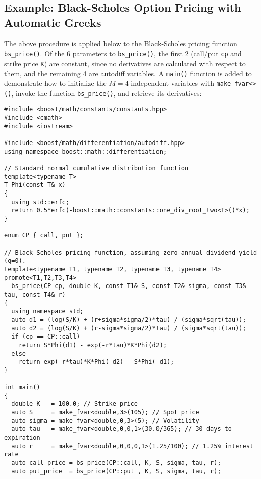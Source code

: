 \documentclass{article}
\begin{document}
\subsection{Example: Black-Scholes Option Pricing with Automatic Greeks}
The above procedure is applied below to the Black-Scholes pricing function {\tt bs\_price()}. Of the 6 parameters
to {\tt bs\_price()}, the first 2 (call/put {\tt cp} and strike price {\tt K}) are constant, since no derivatives
are calculated with respect to them, and the remaining 4 are autodiff variables. A {\tt main()} function is added
to demonstrate how to initialize the $M=4$ independent variables with {\tt make\_fvar<>()}, invoke the function
{\tt bs\_price()}, and retrieve its derivatives:

\begingroup
\fontsize{10pt}{10pt}\selectfont
\begin{verbatim}
#include <boost/math/constants/constants.hpp>
#include <cmath>
#include <iostream>

#include <boost/math/differentiation/autodiff.hpp>
using namespace boost::math::differentiation;

// Standard normal cumulative distribution function
template<typename T>
T Phi(const T& x)
{
  using std::erfc;
  return 0.5*erfc(-boost::math::constants::one_div_root_two<T>()*x);
}

enum CP { call, put };

// Black-Scholes pricing function, assuming zero annual dividend yield (q=0).
template<typename T1, typename T2, typename T3, typename T4>
promote<T1,T2,T3,T4>
  bs_price(CP cp, double K, const T1& S, const T2& sigma, const T3& tau, const T4& r)
{
  using namespace std;
  auto d1 = (log(S/K) + (r+sigma*sigma/2)*tau) / (sigma*sqrt(tau));
  auto d2 = (log(S/K) + (r-sigma*sigma/2)*tau) / (sigma*sqrt(tau));
  if (cp == CP::call)
    return S*Phi(d1) - exp(-r*tau)*K*Phi(d2);
  else
    return exp(-r*tau)*K*Phi(-d2) - S*Phi(-d1);
}

int main()
{
  double K   = 100.0; // Strike price
  auto S     = make_fvar<double,3>(105); // Spot price
  auto sigma = make_fvar<double,0,3>(5); // Volatility
  auto tau   = make_fvar<double,0,0,1>(30.0/365); // 30 days to expiration
  auto r     = make_fvar<double,0,0,0,1>(1.25/100); // 1.25% interest rate
  auto call_price = bs_price(CP::call, K, S, sigma, tau, r);
  auto put_price  = bs_price(CP::put , K, S, sigma, tau, r);


\end{verbatim}
\end{document}
